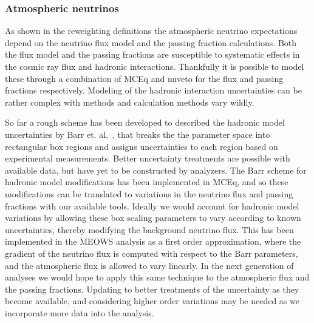 \subsubsection{Atmospheric neutrinos}
As shown in the reweighting definitions the atmospheric neutrino expectations depend on the neutrino flux model and the passing fraction calculations.
Both the flux model and the passing fractions are susceptible to systematic effects in the cosmic ray flux and hadronic interactions.
Thankfully it is possible to model these through a combination of MCEq and nuveto for the flux and passing fractions respectively.
Modeling of the hadronic interaction uncertainties can be rather complex with methods and calculation methods vary wildly.

So far a rough scheme has been developed to described the hadronic model uncertainties by Barr et. al.~\cite{Barr:2004br}, that breaks the the parameter space into rectangular box regions and assigns uncertainties to each region based on experimental measurements.
Better uncertainty treatments are possible with available data, but have yet to be constructed by analyzers.
The Barr scheme for hadronic model modifications has been implemented in MCEq, and so these modifications can be translated to variations in the neutrino flux and passing fractions with our available tools.
Ideally we would account for hadronic model variations by allowing these box scaling parameters to vary according to known uncertainties, thereby modifying the background neutrino flux.
This has been implemented in the MEOWS analysis as a first order approximation, where the gradient of the neutrino flux is computed with respect to the Barr parameters, and the atmospheric flux is allowed to vary linearly.
In the next generation of analyses we would hope to apply this same technique to the atmospheric flux and the passing fractions.
Updating to better treatments of the uncertainty as they become available, and considering higher order variations may be needed as we incorporate more data into the analysis.

